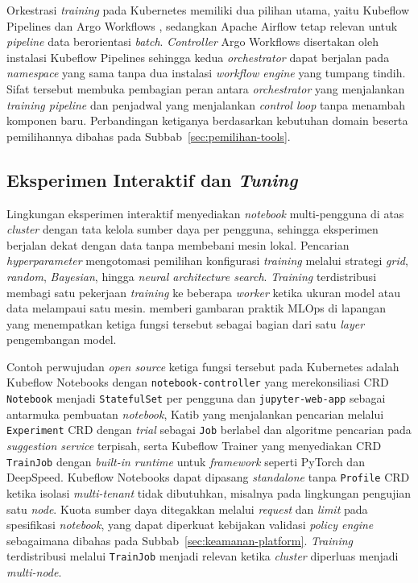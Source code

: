 Orkestrasi \textit{training} pada Kubernetes memiliki dua pilihan utama, yaitu Kubeflow Pipelines \autocite{kubeflow2024} dan Argo Workflows \autocite{argoworkflows2025}, sedangkan Apache Airflow \autocite{airflow2024} tetap relevan untuk \textit{pipeline} data berorientasi \textit{batch}. \textit{Controller} Argo Workflows disertakan oleh instalasi Kubeflow Pipelines sehingga kedua \textit{orchestrator} dapat berjalan pada \textit{namespace} yang sama tanpa dua instalasi \textit{workflow engine} yang tumpang tindih. Sifat tersebut membuka pembagian peran antara \textit{orchestrator} yang menjalankan \textit{training pipeline} dan penjadwal yang menjalankan \textit{control loop} tanpa menambah komponen baru. Perbandingan ketiganya berdasarkan kebutuhan domain beserta pemilihannya dibahas pada Subbab~\ref{sec:pemilihan-tools}.

\subsection{Eksperimen Interaktif dan \textit{Tuning}}
\label{subsec:eksperimen-interaktif}

Lingkungan eksperimen interaktif menyediakan \textit{notebook} multi-pengguna di atas \textit{cluster} dengan tata kelola sumber daya per pengguna, sehingga eksperimen berjalan dekat dengan data tanpa membebani mesin lokal. Pencarian \textit{hyperparameter} mengotomasi pemilihan konfigurasi \textit{training} melalui strategi \textit{grid}, \textit{random}, \textit{Bayesian}, hingga \textit{neural architecture search}. \textit{Training} terdistribusi membagi satu pekerjaan \textit{training} ke beberapa \textit{worker} ketika ukuran model atau data melampaui satu mesin. \textcite{vangala2022mlops} memberi gambaran praktik MLOps di lapangan yang menempatkan ketiga fungsi tersebut sebagai bagian dari satu \textit{layer} pengembangan model.

Contoh perwujudan \textit{open source} ketiga fungsi tersebut pada Kubernetes adalah Kubeflow Notebooks \autocite{kubeflownotebooks2025} dengan \texttt{notebook-controller} yang merekonsiliasi CRD \texttt{Notebook} menjadi \texttt{StatefulSet} per pengguna dan \texttt{jupyter-web-\allowbreak app} sebagai antarmuka pembuatan \textit{notebook}, Katib \autocite{katib2025} yang menjalankan pencarian melalui \texttt{Experiment} CRD dengan \textit{trial} sebagai \texttt{Job} berlabel dan algoritme pencarian pada \textit{suggestion service} terpisah, serta Kubeflow Trainer \autocite{kubeflowtrainer2025} yang menyediakan CRD \texttt{TrainJob} dengan \textit{built-in runtime} untuk \textit{framework} seperti PyTorch dan DeepSpeed. Kubeflow Notebooks dapat dipasang \textit{standalone} tanpa \texttt{Profile} CRD ketika isolasi \textit{multi-tenant} tidak dibutuhkan, misalnya pada lingkungan pengujian satu \textit{node}. Kuota sumber daya ditegakkan melalui \textit{request} dan \textit{limit} pada spesifikasi \textit{notebook}, yang dapat diperkuat kebijakan validasi \textit{policy engine} sebagaimana dibahas pada Subbab~\ref{sec:keamanan-platform}. \textit{Training} terdistribusi melalui \texttt{TrainJob} menjadi relevan ketika \textit{cluster} diperluas menjadi \textit{multi-node}.

